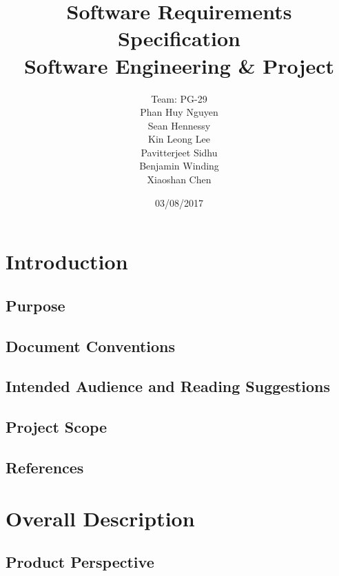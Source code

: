 \documentclass[10pt,a4paper,titlepage]{article}
\begin{document}
	
	\begin{titlepage}
		
	\title{
		\Huge Software Requirements Specification \\
		\large Software Engineering \& Project
		}
	\date{03/08/2017}
	\author{
		Team: PG-29 \\
		Phan Huy Nguyen \\
		Sean Hennessy \\
		Kin Leong Lee \\
		Pavitterjeet Sidhu \\
		Benjamin Winding \\
		Xiaoshan Chen \\
	}
	\maketitle
	
	\end{titlepage}
	
	\tableofcontents
	
	\section{Introduction}
	\subsection{Purpose}
	\subsection{Document Conventions}
	\subsection{Intended Audience and Reading Suggestions}
	\subsection{Project Scope}
	\subsection{References}
	
	\section{Overall Description}
	\subsection{Product Perspective}
\end{document}
